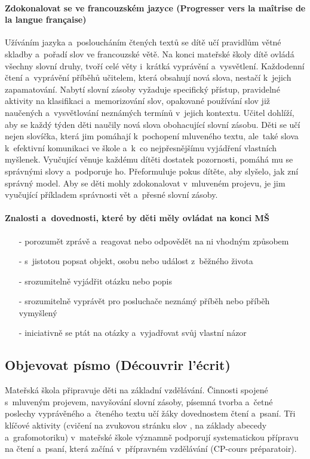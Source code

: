 			\paragraph{Zdokonalovat se ve francouzském jazyce (Progresser vers la maîtrise de la langue française)}
			Užíváním jazyka a~posloucháním čtených textů se dítě učí pravidlům větné skladby a pořadí slov ve francouzské větě. Na konci mateřské školy dítě ovládá všechny slovní druhy, tvoří celé věty i~krátká vyprávění a~vysvětlení. Každodenní čtení a~vyprávění příběhů učitelem, která obsahují nová slova, nestačí k jejich zapamatování. Nabytí slovní zásoby vyžaduje specifický přístup, pravidelné aktivity na klasifikaci a~memorizování slov, opakované používání slov již naučených a~vysvětlování neznámých termínů v jejich kontextu. Učitel dohlíží, aby se každý týden děti naučily nová slova obohacující slovní zásobu. Děti se učí nejen slovíčka, která jim pomáhají k pochopení mluveného textu, ale také slova k efektivní komunikaci ve škole a~k~co nejpřesnějšímu vyjádření vlastních myšlenek. Vyučující věnuje každému dítěti dostatek pozornosti, pomáhá mu se správnými slovy a~podporuje ho. Přeformuluje pokus dítěte, aby slyšelo, jak zní správný model. Aby se děti mohly zdokonalovat v mluveném projevu, je jim vyučující příkladem správnosti vět a~přesné slovní zásoby.

			\paragraph{Znalosti a~dovednosti, které by děti měly ovládat na konci MŠ}
			\begin{itemize}
				\setlength\itemsep{-2mm}
				\item[-] porozumět zprávě a~reagovat nebo odpovědět na ni vhodným způsobem
				\item[-] s jistotou popsat objekt, osobu nebo událost z běžného života
				\item[-] srozumitelně vyjádřit otázku nebo popis
				\item[-] srozumitelně vyprávět pro posluchače neznámý příběh nebo příběh vymyšlený 
				\item[-] iniciativně se ptát na otázky a~vyjadřovat svůj vlastní názor
			\end{itemize}


		\subsection{Objevovat písmo (Découvrir l'écrit)}
			Mateřská škola připravuje děti na základní vzdělávání. Činnosti spojené s mluveným projevem, navyšování slovní zásoby, písemná tvorba a~četné poslechy vyprávěného a~čteného textu učí žáky dovednostem čtení a~psaní. Tři klíčové aktivity (cvičení na zvukovou stránku slov , na základy abecedy a~grafomotoriku) v mateřské škole významně podporují systematickou přípravu na čtení a~psaní, která začíná v přípravném vzdělávání (CP-cours préparatoir).

